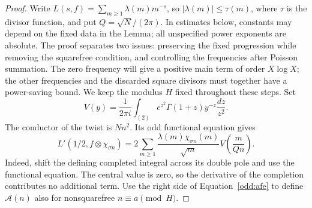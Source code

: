 \begin{proof}
Write $L(s,f)=\sum_{m\ge1}\lambda(m)m^{-s}$, so
$|\lambda(m)|\le\tau(m)$, where $\tau$ is the divisor function, and put $Q=\sqrt N/(2\pi)$.
In estimates below, constants may depend on the fixed data in the Lemma;
all unspecified power exponents are absolute.
The proof separates two issues: preserving the fixed progression while
removing the squarefree condition, and controlling the frequencies after
Poisson summation. The zero frequency will give a positive main term of
order $X\log X$; the other frequencies and the discarded square divisors
must together have a power-saving bound. We keep the modulus $H$ fixed
throughout these steps.
Set
\[
 V(y)=\frac1{2\pi i}\int_{(2)}
 e^{z^2}\Gamma(1+z)y^{-z}\frac{dz}{z^2}.
\]
The conductor of the twist is $Nn^2$.  Its odd functional equation gives
\begin{equation}\label{odd:afe}
 L'(1/2,f\otimes\chi_{\sigma n})
 =2\sum_{m\ge1}\frac{\lambda(m)\chi_{\sigma n}(m)}{\sqrt m}
           V\left(\frac m{Qn}\right).
\end{equation}
Indeed, shift the defining completed integral across its double pole
and use the functional equation.  The central value is zero, so the
derivative of the completion contributes no additional term.
Use the right side of Equation~\eqref{odd:afe} to define $\mathcal A(n)$
also for nonsquarefree $n\equiv a\pmod H$.


\end{proof}
